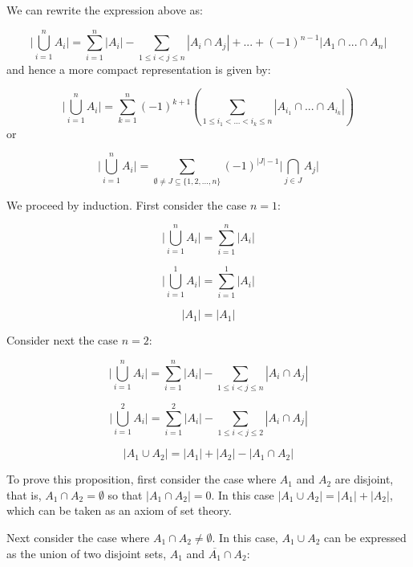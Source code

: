 \documentclass[a4paper,12pt]{article}
\begin{document}

We can rewrite the expression above as:

\[ \bigg|\bigcup_{i=1}^n A_i \bigg| = \sum_{i=1}^n |A_i| - \sum_{1 \le i < j \le n}|A_i \cap A_j| + ... + (-1)^{n-1}|A_1 \cap ... \cap A_n| \] 
and hence a more compact representation is given by:

\[ \bigg|\bigcup_{i=1}^n A_i \bigg| = \sum_{k=1}^n(-1)^{k+1}\left(\sum_{1 \le i_1 < ... < i_k \le n} |A_{i_1} \cap ... \cap A_{i_k}|\right) \]
or

\[ \bigg|\bigcup_{i=1}^n A_i \bigg| = \sum_{\emptyset \ne J \subseteq \{1, 2, ..., n\}}(-1)^{|J|-1} \bigg|\bigcap_{j \in J} A_j\bigg|\]

\vspace{2mm}
We proceed by induction. First consider the case $n=1$:

\[ \bigg|\bigcup_{i=1}^n A_i \bigg| = \sum_{i=1}^n |A_i|  \]

\[ \bigg|\bigcup_{i=1}^1 A_i \bigg| = \sum_{i=1}^1 |A_i|  \]

\[ |A_1| = |A_1|\]

Consider next the case $n=2$:

\[ \bigg|\bigcup_{i=1}^n A_i \bigg| = \sum_{i=1}^n |A_i|  - \sum_{1 \le i < j \le n}|A_i \cap A_j| \]

\[ \bigg|\bigcup_{i=1}^2 A_i \bigg| = \sum_{i=1}^2 |A_i|  - \sum_{1 \le i < j \le 2}|A_i \cap A_j| \]

\[ |A_1 \cup A_2| = |A_1| + |A_2| - |A_1 \cap A_2| \]

To prove this proposition, first consider the case where $A_1$ and $A_2$ are disjoint, that is, $A_1
\cap  A_2 = \emptyset$ so that $|A_1 \cap A_2| = 0$. In this case $|A_1 \cup A_2| = |A_1| + |A_2|$, which can be taken as an axiom of set theory. 

Next consider the case where $A_1 \cap A_2 \ne \emptyset$. In this case, $A_1 \cup A_2$ can be expressed as the union of two disjoint sets, $A_1$ and $\overline{A_1} \cap A_2$:
\end{document}
